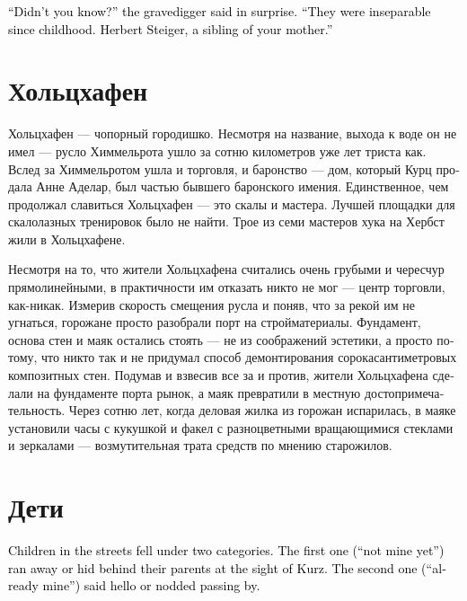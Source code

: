 \documentclass[a4paper,12pt,fleqn]{book}\usepackage{cooltooltips}\usepackage{polyglossia}\setdefaultlanguage[babelshorthands=true]{russian}\setotherlanguage{english}\defaultfontfeatures{Ligatures=TeX,Mapping=tex-text} \usepackage{xcolor}\definecolor{lightgray}{HTML}{bbbbbb}\color{lightgray}\newcommand{\ml}[3]{\textenglish{\textcolor{black}{#3}}}
\begin{document}
\ml{$0$}
{--- А вы не знаете? --- удивился могильщик, обернувшись и поправив шапку.}
{``Didn't you know?'' the gravedigger said in surprise.}
\ml{$0$}
{--- Они были неразлучны с самого детства.}
{``They were inseparable since childhood.}
\ml{$0$}
{Герберт Штайгер, родной брат вашей мамы.}
{Herbert Steiger, a sibling of your mother.''}

\section{Хольцхафен}

Хольцхафен --- чопорный городишко.
Несмотря на название, выхода к воде он не имел --- русло Химмельрота ушло за сотню километров уже лет триста как.
Вслед за Химмельротом ушла и торговля, и баронство --- дом, который Курц продала Анне Аделар, был частью бывшего баронского имения.
Единственное, чем продолжал славиться Хольцхафен --- это скалы и мастера.
Лучшей площадки для скалолазных тренировок было не найти.
Трое из семи мастеров хука на Хербст жили в Хольцхафене.

Несмотря на то, что жители Хольцхафена считались очень грубыми и чересчур прямолинейными, в практичности им отказать никто не мог --- центр торговли, как-никак.
Измерив скорость смещения русла и поняв, что за рекой им не угнаться, горожане просто разобрали порт на стройматериалы.
Фундамент, основа стен и маяк остались стоять --- не из соображений эстетики, а просто потому, что никто так и не придумал способ демонтирования сорокасантиметровых композитных стен.
Подумав и взвесив все за и против, жители Хольцхафена сделали на фундаменте порта рынок, а маяк превратили в местную достопримечательность.
Через сотню лет, когда деловая жилка из горожан испарилась, в маяке установили часы с кукушкой и факел с разноцветными вращающимися стеклами и зеркалами --- возмутительная трата средств по мнению старожилов.

\section{Дети}

\ml{$0$}
{Встреченные на улице дети делились на две категории.}
{Children in the streets fell under two categories.}
\ml{$0$}
{Первая, <<ещё не мои>>, при виде Курц убегали или прятались за родителей.}
{The first one (``not mine yet'') ran away or hid behind their parents at the sight of Kurz.}
\ml{$0$}
{Вторая, <<уже мои>>, здоровались или кивали, проходя мимо.}
{The second one (``already mine'') said hello or nodded passing by.}
\end{document}
